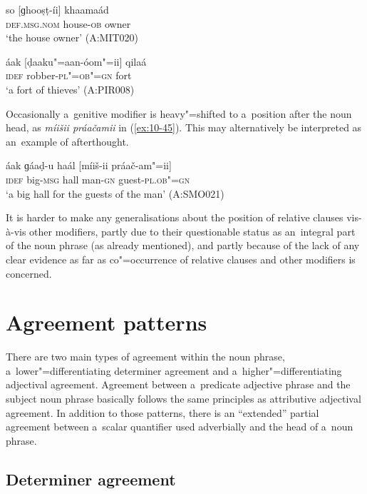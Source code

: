 \begin{exe}
\ex
\label{ex:10-43}
\gll so [ɡhooṣṭ-íi] khaamaád \\
\textsc{def.msg.nom} house-\textsc{ob} owner  \\
\glt `the house owner' (A:MIT020)

\ex
\label{ex:10-44}
\gll áak [ḍaaku"=aan-óom"=ii] qilaá  \\
\textsc{idef} robber-\textsc{pl"=ob"=gn} fort  \\
\glt `a fort of thieves' (A:PIR008)
\end{exe}


Occasionally a~genitive modifier is heavy"=shifted to a~position after the noun head, as \textit{míišii práačamii} in (\ref{ex:10-45}). This may alternatively be interpreted as an~example of afterthought.

\begin{exe}
\ex
\label{ex:10-45}
\gll áak ɡáaḍ-u haál [míiš-ii práač-am"=ii] \\
\textsc{idef} big-\textsc{msg} hall man-\textsc{gn} guest-\textsc{pl.ob"=gn}  \\
\glt `a big hall for the guests of the man' (A:SMO021)
\end{exe}


It is harder to make any generalisations about the position of relative clauses vis-à-vis other modifiers, partly due to their questionable status as an~integral part of the noun phrase (as already mentioned), and partly because of the lack of any clear evidence as far as co"=occurrence of relative clauses and other modifiers is concerned.


\section{Agreement patterns}
\label{sec:10-3}

There are two main types of agreement within the noun phrase, a~lower"=differentiating determiner agreement and a~higher"=differentiating adjectival agreement. Agreement between a~predicate adjective phrase and the subject noun phrase basically follows the same principles as attributive adjectival agreement. In addition to those patterns, there is an ``extended'' partial agreement between a~scalar quantifier used adverbially and the head of a~noun phrase.


\subsection{Determiner agreement}
\label{subsec:10-3-1}


